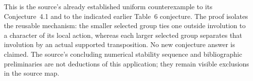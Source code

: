 \documentclass[a4paper,11pt]{article}
\begin{document}
This is the source's already established uniform counterexample to its
Conjecture~4.1 and to the indicated earlier Table~6 conjecture. The proof
isolates the reusable mechanism: the smaller selected group ties one outside
involution to a character of its local action, whereas each larger selected
group separates that involution by an actual supported transposition.
No new conjecture answer is claimed. The source's concluding numerical
stability sequence and bibliographic preliminaries are not deductions of this
application; they remain visible exclusions in the source map.
\end{document}
